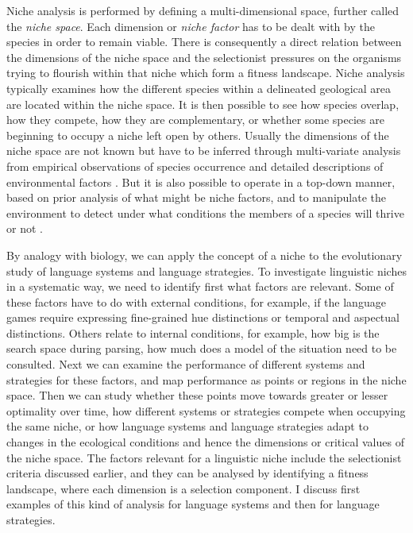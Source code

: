 Niche analysis is performed by defining a multi-dimensional space, further called the {\itshape niche space}. Each 
dimension or {\itshape niche factor} has to be dealt with by the species in order to remain viable. There 
is consequently a direct
relation between the dimensions of the niche space and the selectionist pressures on the organisms trying to flourish 
within that niche which form a fitness landscape. Niche analysis
 typically examines how the different species within a delineated geological area 
are located within the niche space. It is then possible 
to see how species overlap, how they compete, how they are complementary, or whether some species are beginning
to occupy a niche left open by others. Usually the dimensions of the niche space are not known but have 
to be inferred through multi-variate analysis from empirical observations of species occurrence and 
detailed descriptions of environmental factors \citep{Elith:2009}.  But it is also possible to 
operate in a top-down manner, based on prior analysis of what might be niche factors, and to manipulate the environment 
to detect under what conditions the members of a species will thrive or not \citep{Nosil:2008}. 

By analogy with biology, we can apply the concept of a niche to the evolutionary study of
language systems and language strategies. To investigate linguistic niches in a systematic way, we need to identify first 
what factors are relevant. Some of these factors 
have to do with external conditions, for example, if the language games require expressing fine-grained hue distinctions or 
temporal and aspectual distinctions. Others relate to internal conditions, for example, how big is the search space during parsing, 
how much does a model of the situation need to be consulted. Next we can 
examine the performance of different systems and strategies for these factors, and map performance as 
points or regions in the niche space. Then we can study whether these points move towards greater or lesser optimality over time, 
how different systems or strategies compete when occupying the same niche, or how language systems and language 
strategies adapt to changes in the ecological conditions and hence the dimensions or critical values
of the niche space. The factors relevant for a linguistic niche include the selectionist criteria discussed earlier, 
and they can be analysed by identifying a fitness landscape, where each dimension is a selection component. 
I discuss first examples of this kind of analysis for language systems and then for language strategies. \\

